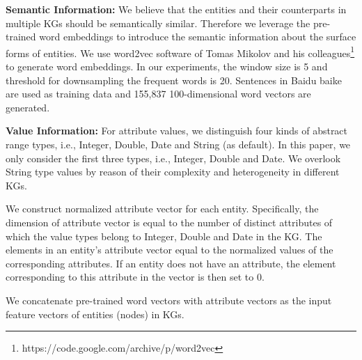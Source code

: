 	\noindent \textbf{Semantic Information:}
	\label{wordvector}
	We believe that the entities and their counterparts in multiple KGs should be semantically similar. Therefore we leverage the pre-trained word embeddings to introduce the semantic information about the surface forms of entities.
	We use word2vec software of Tomas Mikolov and his colleagues\footnote{https://code.google.com/archive/p/word2vec} to generate word embeddings. In our experiments, the window size is 5 and threshold for downsampling the frequent words is 20. Sentences in Baidu baike are used as training data and 155,837 100-dimensional word vectors are generated.
	
	\noindent \textbf{Value Information:}
	For attribute values, we distinguish four kinds of abstract range types, i.e., Integer, Double, Date and String (as default). In this paper, we only consider the first three types, i.e., Integer, Double and Date. We overlook String type values by reason of their complexity and heterogeneity in different KGs.
	
	We construct normalized attribute vector for each entity. Specifically, the dimension of attribute vector is equal to the number of distinct attributes of which the value types belong to Integer, Double and Date in the KG. The elements in an entity’s attribute vector equal to the normalized values of the corresponding attributes. If an entity does not have an attribute, the element corresponding to this attribute in the vector is then set to 0.
	
	We concatenate pre-trained word vectors with attribute vectors as the input feature vectors of entities (nodes) in KGs.
	
